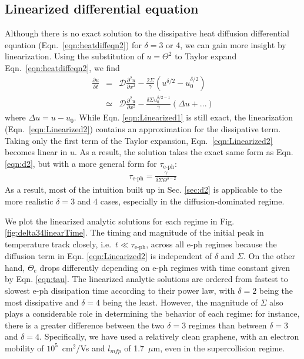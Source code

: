 \documentclass[aip, amsmath,amssymb, reprint]{revtex4-1}
\newcommand{\ba}{\begin{eqnarray}}
\newcommand{\ea}{\end{eqnarray}}
\begin{document}
\subsection{Linearized differential equation}

Although there is no exact solution to the dissipative heat diffusion differential equation (Eqn.\ \ref{eqn:heatdiffeqn2}) for $\delta = 3$ or 4, we can gain more insight by linearization. Using the substitution of $u = \Theta^2$ to Taylor expand Eqn.\ \ref{eqn:heatdiffeqn2}, we find \ba \frac{\partial u}{\partial t} &=& \mathcal{D}\frac{\partial^2 u}{\partial x^2} - \frac{2\Sigma}{\gamma}\left(u^{\delta/2}-u_0^{\delta/2}\right)\label{eqn:Linearized1}\\
&\simeq& \mathcal{D}\frac{\partial^2 u}{\partial x^2} - \frac{\delta \Sigma u_0^{\delta/2 -1}}{\gamma}\left(\Delta u + ... \right)\label{eqn:Linearized2}\ea where $\Delta u = u - u_0$. While Eqn. \ref{eqn:Linearized1} is still exact, the linearization (Eqn.\ \ref{eqn:Linearized2}) contains an approximation for the dissipative term. Taking only the first term of the Taylor expansion, Eqn.\ \ref{eqn:Linearized2} becomes linear in $u$. As a result, the solution takes the exact same form as Eqn. \ref{eqn:d2}, but with a more general form for $\tau_{\text{e-ph}}:$  \ba \tau_{\text{e-ph}} = \frac{\gamma}{\delta \Sigma \Theta^{\delta - 2}} \label{eqn:tau} \ea As a result, most of the intuition built up in Sec. \ref{sec:d2} is applicable to the more realistic $\delta = 3$ and 4 cases, especially in the diffusion-dominated regime.

We plot the linearized analytic solutions for each regime in Fig. \ref{fig:delta34linearTime}. The timing and magnitude of the initial peak in temperature track closely, i.e.~$t \ll \tau_{\text{e-ph}}$, across all e-ph regimes because the diffusion term in Eqn. \ref{eqn:Linearized2} is independent of $\delta$ and $\Sigma$. On the other hand, $\Theta_e$ drops differently depending on e-ph regimes with time constant given by Eqn. \ref{eqn:tau}. The linearized analytic solutions are ordered from fastest to slowest e-ph dissipation time according to their power law, with $\delta = 2$ being the most dissipative and $\delta = 4$ being the least. However, the magnitude of $\Sigma$ also plays a considerable role in determining the behavior of each regime: for instance, there is a greater difference between the two $\delta = 3$ regimes than between $\delta = 3$ and $\delta = 4$. Specifically, we have used a relatively clean graphene, with an electron mobility of $10^5$~cm$^2$/Vs and $l_{mfp}$ of 1.7~$\mu$m, even in the supercollision regime.
\end{document}
